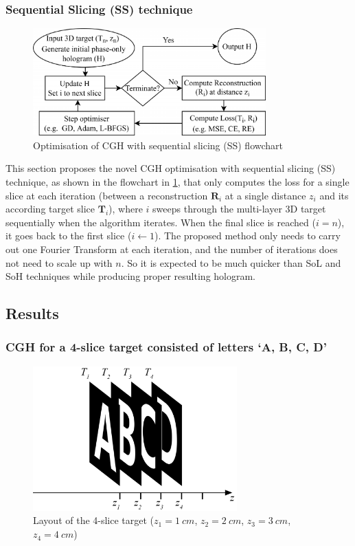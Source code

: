 \subsubsection{Sequential Slicing (SS) technique}
\begin{figure}[H]
	\centering
	\includegraphics[width=0.8\textwidth]{optim3d-cgh-flowchart}
	\caption{Optimisation of CGH with sequential slicing (SS) flowchart}
	\label{fig:optim3d-cgh-flowchart}
\end{figure}

This section proposes the novel CGH optimisation with sequential slicing (SS) technique, as shown in the flowchart in \cref{fig:optim3d-cgh-flowchart}, that only computes the loss for a single slice at each iteration (between a reconstruction $\textbf{R}_i$ at a single distance $z_i$ and its according target slice $\textbf{T}_i$), where $i$ sweeps through the multi-layer 3D target sequentially when the algorithm iterates. When the final slice is reached ($i=n$), it goes back to the first slice ($i \gets 1$). The proposed method only needs to carry out one Fourier Transform at each iteration, and the number of iterations does not need to scale up with $n$. So it is expected to be much quicker than SoL and SoH techniques while producing proper resulting hologram.

\subsection{Results}
\subsubsection{CGH for a 4-slice target consisted of letters `A, B, C, D'}

\begin{figure}[H]
	\centering
	\includegraphics[width=0.7\textwidth]{Fresnel_slice_ABCD}
	\caption{Layout of the 4-slice target ($z_1=1\ cm$, $z_2=2\ cm$, $z_3=3\ cm$, $z_4=4\ cm$)}
	\label{fig:Fresnel_slice_ABCD}
\end{figure}

